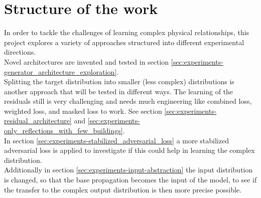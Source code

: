 	\section{Structure of the work}
	\label{sec:structure-of-work}
		In order to tackle the challenges of learning complex physical relationships, this project explores a variety of approaches structured into different experimental directions.\\
		Novel architectures are invented and tested in section \ref{sec:experiments-generator_architecture_exploration}.\\
		Splitting the target distribution into smaller (less complex) distributions is another approach that will be tested in different ways. The learning of the residuals still is very challenging and needs much engineering like combined loss, weighted loss, and masked loss to work. See section \ref{sec:experiments-residual_architecture} and \ref{sec:experiments-only_reflections_with_few_buildings}.\\
		In section \ref{sec:experiments-stabilized_adversarial_loss} a more stabilized adversarial loss is applied to investigate if this could help in learning the complex distribution.\\
		Additionally in section \ref{sec:experiments-input-abstraction} the input distribution is changed, so that the base propagation becomes the input of the model, to see if the transfer to the complex output distribution is then more precise possible.
		
		
		
		
		
		
		
		